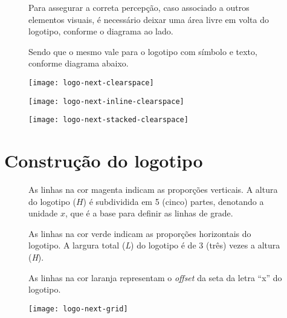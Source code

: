 \documentclass{manualmarca}
\begin{document}
\begin{figure}[!htp]
  \centering
  \begin{minipage}{.32\textwidth}
    Para assegurar a correta percepção, caso associado a outros elementos visuais, é necessário deixar uma área livre em volta do logotipo, conforme o diagrama ao lado.

    Sendo que o mesmo vale para o logotipo com símbolo e texto, conforme diagrama abaixo.
  \end{minipage}%
  \hfill
  \begin{minipage}{.65\textwidth}
  \centering
  \texttt{[image: logo-next-clearspace]}
\end{minipage}
\end{figure}

\begin{figure}[!htp]
  \centering
  \texttt{[image: logo-next-inline-clearspace]}
\end{figure}


\begin{figure}[!htp]
  \centering
  \texttt{[image: logo-next-stacked-clearspace]}
\end{figure}
\pagebreak[4]

\section{Construção do logotipo}
\label{sec:const-logotipo}

\begin{figure}[!htp]
  \centering
  \begin{minipage}{.32\textwidth}
    As linhas na cor {\color[named]{magenta} magenta} indicam as proporções verticais. A altura do logotipo (\emph{$H$}) é subdividida em 5 (cinco) partes, denotando a unidade $x$, que é a base para definir as linhas de grade.
    
    As linhas na cor {\color{black!30!green} verde} indicam as proporções horizontais do logotipo. A largura total (\emph{L}) do logotipo é de 3 (três) vezes a altura (\emph{H}).

    As linhas na cor {\color{orange} laranja} representam o \emph{offset} da seta da letra ``x'' do logotipo.
  \end{minipage}%
  \hfill
  \begin{minipage}{.65\textwidth}
  \centering
  \texttt{[image: logo-next-grid]}
\end{minipage}
\end{figure}
\end{document}
